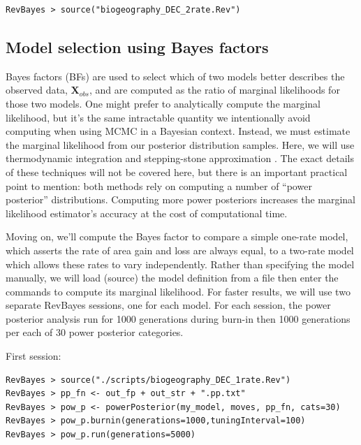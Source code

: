 \documentclass[11pt]{article}
\begin{document}
\begin{snugshade}
\begin{lstlisting}
RevBayes > source("biogeography_DEC_2rate.Rev")
\end{lstlisting}
\end{snugshade}

\subsection{Model selection using Bayes factors}

Bayes factors (BFs) are used to select which of two models better describes the observed data, $\mathbf{X}_{obs}$, and are computed as the ratio of marginal likelihoods for those two models.
One might prefer to analytically compute the marginal likelihood, but it's the same intractable quantity we intentionally avoid computing when using MCMC in a Bayesian context.
Instead, we must estimate the marginal likelihood from our posterior distribution samples.
Here, we will use thermodynamic integration \citep{lartillot06} and stepping-stone approximation \citep{xie10}.
The exact details of these techniques will not be covered here, but there is an important practical point to mention: both methods rely on computing a number of ``power posterior'' distributions.
Computing more power posteriors increases the marginal likelihood estimator's accuracy at the cost of computational time.

Moving on, we'll compute the Bayes factor to compare a simple one-rate model, which asserts the rate of area gain and loss are always equal, to a two-rate model which allows these rates to vary independently.
Rather than specifying the model manually, we will load (source) the model definition from a file then enter the commands to compute its marginal likelihood.
For faster results, we will use two separate RevBayes sessions, one for each model.
For each session, the power posterior analysis run for 1000 generations during burn-in then 1000 generations per each of 30 power posterior categories.

First session:
\begin{snugshade}
\begin{lstlisting}
RevBayes > source("./scripts/biogeography_DEC_1rate.Rev")
RevBayes > pp_fn <- out_fp + out_str + ".pp.txt"
RevBayes > pow_p <- powerPosterior(my_model, moves, pp_fn, cats=30) 
RevBayes > pow_p.burnin(generations=1000,tuningInterval=100)
RevBayes > pow_p.run(generations=5000)
\end{lstlisting}
\end{snugshade}
\end{document}
